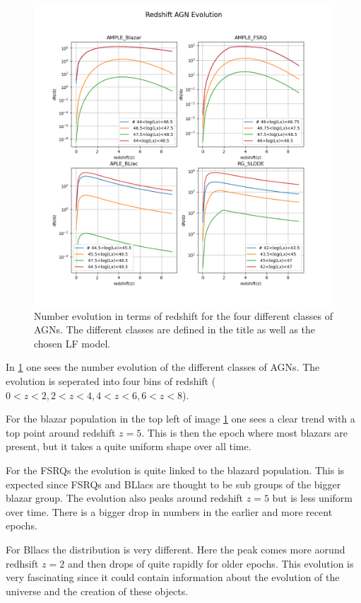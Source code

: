 \documentclass{article}
\begin{document}
\begin{figure}
    \centering
    \includegraphics[width = \textwidth]{Redshift AGN Evolution.png}
    \caption{Number evolution in terms of redshift for the four different classes of AGNs. The different classes are defined in the title as well as the chosen LF model.}
    \label{fig:ND}
\end{figure}



In \ref{fig:ND} one sees the number evolution of the different classes of AGNs. The evolution is seperated into four bins of redshift ($0<z<2,2<z<4,4<z<6,6<z<8$).

For the blazar population in the top left of image \ref{fig:ND} one sees a clear trend with a top point around redshift $z=5$. 
This is then the epoch where most blazars are present, but it takes a quite uniform shape over all time.


For the FSRQs the evolution is quite linked to the blazard population. This is expected since FSRQs and BLlacs are thought to be 
sub groups of the bigger blazar group. The evolution also peaks around redshift $z=5$ but is less uniform over time. There is a bigger drop 
in numbers in the earlier and more recent epochs. 

For Bllacs the distribution is very different. Here the peak comes more aorund redhsift $z=2$ and then drops of quite rapidly for older epochs.
This evolution is very fascinating since it could contain information about the evolution of the universe and the creation of these 
objects. 
\end{document}
